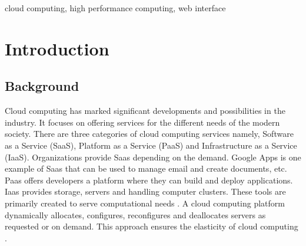 \documentclass[journal]{./IEEE/IEEEtran}
\title{\SPTITLE}
\author{\ADVISEE~and~\ADVISER~and~\ADVISERR%
\REMARK
}
\begin{document}
\maketitle

\begin{abstract}
	Most scientific applications require high performance computing (HPC) which utilizes parallel processing to run tasks quickly and efficiently. MPI clusters are often used to cater this type of tasks but the hardware required can be costly. Peak-Two Cloud (P2C) can host HPC applications in a cloud environment which is relatively cheaper and more convenient. One of its features is vCluster, a tool that can deploy MPI clusters on demand\cite{Hermocilla2014}. We have developed SkyLab, a web interface for vCluster. It aims to simplify the process of running MPI tasks from the perspective of the end-user. Here, we describe the system design and features of SkyLab. 
\end{abstract}

\begin{keywords}
cloud computing, high performance computing, web interface
\end{keywords}

\section{Introduction}
	\subsection{Background}
	Cloud computing has marked significant developments and possibilities in the industry. It focuses on offering services for the different needs of the modern society.
	 There are three categories of cloud computing services namely, Software as a Service (SaaS), Platform as a Service (PaaS) and Infrastructure as a Service (IaaS). Organizations provide Saas depending on the demand. Google Apps is one example of Saas that can be used to manage email and create documents, etc. Paas offers developers a platform where they can build and deploy applications. Iaas provides storage, servers and handling computer clusters. These tools are primarily created to serve computational needs \cite {Ahuja2012}. A cloud computing platform dynamically allocates, configures, reconfigures and deallocates servers as requested or on demand. This approach ensures the elasticity of cloud computing \cite {Brandic2011}.
\end{document}
